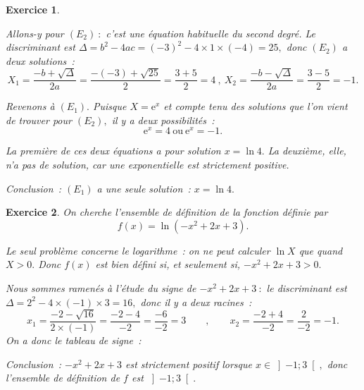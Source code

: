 \documentclass[10pt]{article}
\newtheorem{exo}{Exercice}
\begin{document}
\begin{exo}
\begin{enumerate}
\medskip

Allons-y pour $\left(E_2\right)~:$ c'est une équation habituelle du second degré. Le discriminant est $\Delta=b^2-4ac=(-3)^2-4\times 1\times (-4)=25,$ donc $\left(E_2\right)$ a deux solutions~:
\[X_1=\frac{-b+\sqrt{\Delta}}{2a}=\frac{-(-3)+\sqrt{25}}{2}=\frac{3+5}{2}=4~,~X_2=\frac{-b-\sqrt{\Delta}}{2a}=\frac{3-5}{2}=-1
.\]

Revenons à $\left(E_1\right).$ Puisque  $X=\text{e}^x$ et compte tenu des solutions que l'on vient de trouver pour $\left(E_2\right),$ il y a deux possibilités~:
\[\text{e}^x=4~\text{ou}~\text{e}^x=-1.\]

La première de ces deux équations a pour solution $x=\ln 4.$ La deuxième, elle, n'a pas de solution, car une exponentielle est strictement positive.

\medskip

Conclusion~: $\left(E_1\right)$ a une seule solution~: $x=\ln 4.$
\end{enumerate}



\end{exo}

\begin{exo}

On cherche l'ensemble de définition de la fonction définie par
\[f(x)=\ln\left(-x^2+2x+3\right).\]

Le seul problème concerne le logarithme~: on ne peut calculer $\ln X$ que quand $X>0.$ Donc $f(x)$ est bien défini si, et seulement si, $-x^2+2x+3>0.$

\medskip

Nous sommes ramenés à l'étude du signe de $-x^2+2x+3~:$ le discriminant est $\Delta=2^2-4\times (-1)\times 3=16,$ donc il y a deux racines~:
\[x_1=\frac{-2-\sqrt{16}}{2\times (-1)}=\frac{-2-4}{-2}=\frac{-6}{-2}=3\qquad,\qquad x_2=\frac{-2+4}{-2}=\frac{2}{-2}=-1.\]
On a donc le tableau de signe~:

\begin{center}
\end{center}
\medskip

Conclusion~: $-x^2+2x+3$ est strictement positif lorsque $x\in\left]-1;3\right[,$ donc l'ensemble de définition de $f$ est $\left]-1;3\right[.$

\end{exo}
\end{document}
